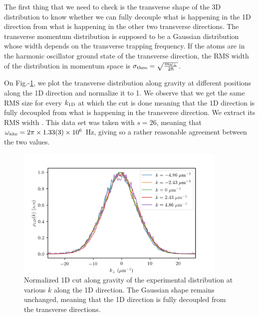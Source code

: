 The first thing that we need to check is the transverse shape of the 3D distribution to know whether we can fully decouple what is happening in the 1D direction from what is happening in the other two transverse directions. The transverse momentum distribution is supposed to be a Gaussian distribution whose width depends on the transverse trapping frequency. If the atoms are in the harmonic oscillator ground state of the transverse direction, the RMS width of the distribution in momentum space is $\sigma_{\rm{theo}}=\sqrt{\frac{m \omega_{\perp}}{2 \hbar}}$. 

On Fig.-\ref{fig:1D_transverse}, we plot the transverse distribution along gravity at different positions along the 1D direction and normalize it to 1. We observe that we get the same RMS size for every $k_{\rm{1D}}$ at which the cut is done meaning that the 1D direction is fully decoupled from what is happening in the transverse direction. We extract its RMS width . This data set was taken with $s=26$, meaning that $\omega_{\rm{site}}=2 \pi \times 1.33(3) \times 10^6$ Hz, giving  so a rather reasonable agreement between the two values. 

\begin{figure}
    \centering
    \includegraphics[width=0.9\textwidth]{Fig/Chapter5/1D_transverse_effect.png}
    \caption[Normalized 1D cut along gravity of the experimental distribution at various $k$ along the 1D direction]{Normalized 1D cut along gravity of the experimental distribution at various $k$ along the 1D direction. The Gaussian shape remains unchanged, meaning that the 1D direction is fully decoupled from the transverse directions.}
    \label{fig:1D_transverse}
\end{figure}


